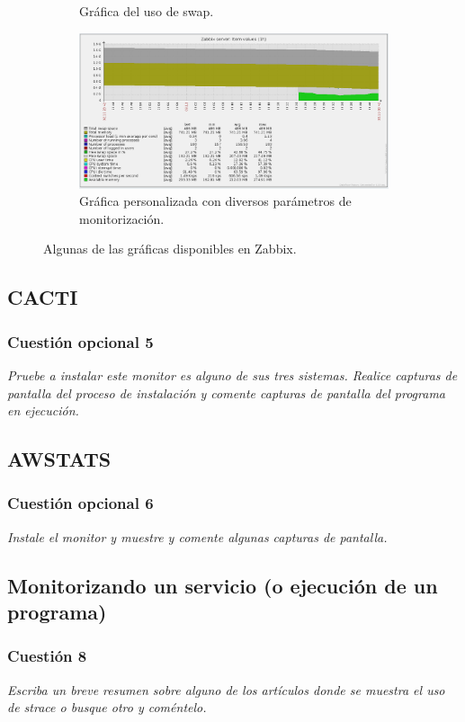 \begin{figure}[H]
\begin{subfigure}[b]{0.5\linewidth}
    \caption{Gráfica del uso de swap.} 
  \end{subfigure}%
  \begin{subfigure}[b]{0.5\linewidth}
    \centering
    \includegraphics[width=0.95\linewidth]{imagenes/g4} 
    \caption{Gráfica personalizada con diversos parámetros de monitorización.} 
  \end{subfigure} 
  \caption{Algunas de las gráficas disponibles en Zabbix. }
  \label{fig39} 
\end{figure}


\subsection{CACTI}
\subsubsection{Cuestión opcional 5}
\textit{Pruebe a instalar este monitor es alguno de sus tres sistemas. Realice capturas de pantalla del proceso de instalación y comente capturas de pantalla del programa en ejecución.}
\subsection{AWSTATS}


\subsubsection{Cuestión opcional 6}
\textit{Instale el monitor y muestre y comente algunas capturas de pantalla.}


\subsection{Monitorizando un servicio (o ejecución de un programa)}
\subsubsection{Cuestión 8}
\textit{Escriba un breve resumen sobre alguno de los artículos donde se muestra el uso de strace o busque otro y coméntelo.}
\newline

